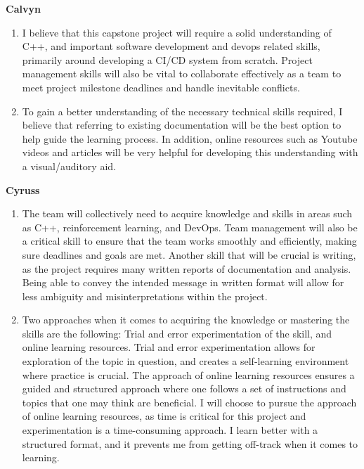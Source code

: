 \documentclass[12pt]{article}
\begin{document}
\textbf{Calvyn}

\begin{enumerate}

\item I believe that this capstone project will require a solid understanding of C++, and important software development and devops related skills, primarily around developing a CI/CD system from scratch. Project management skills will also be vital to collaborate effectively as a team to meet project milestone deadlines and handle inevitable conflicts.

\item To gain a better understanding of the necessary technical skills required, I believe that referring to existing documentation will be the best option to help guide the learning process. In addition, online resources such as Youtube videos and articles will be very helpful for developing this understanding with a visual/auditory aid.


\end{enumerate}

\textbf{Cyruss}


\begin{enumerate}

  \item The team will collectively need to acquire knowledge and skills in areas such as C++, reinforcement learning, and DevOps. Team management will also be a critical skill to ensure that the team works smoothly and efficiently, making sure deadlines and goals are met. Another skill that will be crucial is writing, as the project requires many written reports of documentation and analysis. Being able to convey the intended message in written format will allow for less ambiguity and misinterpretations within the project.

  
  
  \item   Two approaches when it comes to acquiring the knowledge or mastering the skills are the following: Trial and error experimentation of the skill, and online learning resources. Trial and error experimentation allows for exploration of the topic in question, and creates a self-learning environment where practice is crucial. The approach of online learning resources ensures a guided and structured approach where one follows a set of instructions and topics that one may think are beneficial. I will choose to pursue the approach of online learning resources, as time is critical for this project and experimentation is a time-consuming approach. I learn better with a structured format, and it prevents me from getting off-track when it comes to learning.
  
  \end{enumerate}
\end{document}
